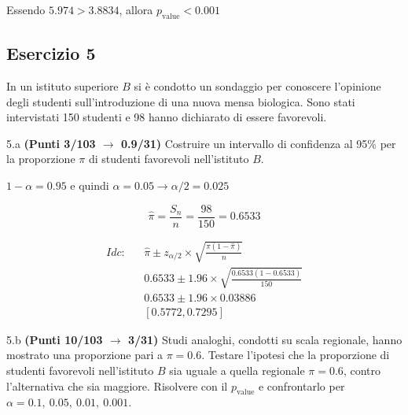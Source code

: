 \documentclass[
  11pt,
]{book}
\theoremstyle{mytheoremstyle}
\theoremstyle{mydefstyle}
\newenvironment{sol}
  {
  \begin{tcolorbox}[enhanced,breakable,arc=0.1mm,boxrule=1pt,colback=white,colframe=iblue,
  title=\bf \fontfamily{lmss}\selectfont \hspace{.5 cm} Soluzione,drop fuzzy shadow]

}{
\end{tcolorbox}
  }
\begin{document}
\begin{sol}
Essendo \(5.974> 3.8834\), allora
\(p_\text{value}<0.001\)

\end{sol}

\subsection{Esercizio 5}\label{esercizio-5-49}

In un istituto superiore \(B\) si è condotto un sondaggio per conoscere l'opinione degli studenti sull'introduzione di una nuova mensa biologica. Sono stati intervistati 150 studenti e 98 hanno dichiarato di essere favorevoli.

5.a \textbf{(Punti 3/103 \(\rightarrow\) 0.9/31)} Costruire un intervallo di confidenza al 95\% per la proporzione \(\pi\) di studenti favorevoli nell'istituto \(B\).

\begin{sol}
\(1-\alpha =0.95\) e quindi \(\alpha=0.05\rightarrow \alpha/2=0.025\)

\[
  \hat\pi = \frac{S_n}n = \frac{ 98 }{ 150 }= 0.6533 
\]

\begin{eqnarray*}
  Idc: & &  \hat\pi \pm  z_{\alpha/2} \times \sqrt{\frac{\hat\pi(1-\hat\pi)}{n}} \\
     & &  0.6533 \pm  1.96 \times \sqrt{\frac{ 0.6533 (1- 0.6533 )}{ 150 }} \\
     & &  0.6533 \pm  1.96 \times  0.03886 \\
     & & [ 0.5772 ,  0.7295 ]
\end{eqnarray*}

\end{sol}

5.b \textbf{(Punti 10/103 \(\rightarrow\) 3/31)} Studi analoghi, condotti su scala regionale, hanno mostrato una proporzione pari a \(\pi=0.6\). Testare l'ipotesi che la proporzione di studenti favorevoli nell'istituto \(B\) sia uguale a quella regionale \(\pi=0.6\), contro l'alternativa che sia maggiore. Risolvere con il \(p_\text{value}\) e confrontarlo per \(\alpha = 0.1,\ 0.05,\ 0.01,\ 0.001\).
\end{document}

